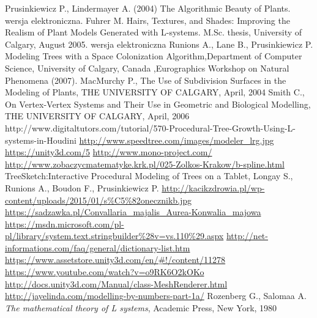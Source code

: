 \documentclass[b5paper,twoside,11pt]{article}
\begin{document}
\begin{thebibliography}{99}
Prusinkiewicz P., Lindermayer A. (2004) The Algorithmic Beauty of Plants.  wersja elektroniczna.
Fuhrer M. Hairs, Textures, and Shades: Improving the Realism of Plant Models Generated with L-systems. M.Sc. thesis, University of Calgary, August 2005. wersja elektroniczna
Runions A., Lane B., Prusinkiewicz P. Modeling Trees with a Space Colonization Algorithm,Department of Computer Science, University of Calgary, Canada ,Eurographics Workshop on Natural Phenomena (2007).
 MacMurchy P., The Use of Subdivision Surfaces in the Modeling of Plants, THE UNIVERSITY OF CALGARY, April, 2004
 Smith C., On Vertex-Vertex Systems and Their Use in Geometric and Biological Modelling, THE UNIVERSITY OF CALGARY, April, 2006
http://www.digitaltutors.com/tutorial/570-Procedural-Tree-Growth-Using-L-systems-in-Houdini
\url{http://www.speedtree.com/images/modeler_lrg.jpg}
\url{https://unity3d.com/5}
\url{http://www.mono-project.com/}
\url{http://www.zobaczycmatematyke.krk.pl/025-Zolkos-Krakow/b-spline.html}
TreeSketch:Interactive Procedural Modeling of Trees on a Tablet, Longay S.,  Runions A., Boudon F., Prusinkiewicz P.
\url{http://kacikzdrowia.pl/wp-content/uploads/2015/01/s%C5%82onecznikb.jpg}
\url{https://sadzawka.pl/Convallaria_majalis_Aurea-Konwalia_majowa}
\url{https://msdn.microsoft.com/pl-pl/library/system.text.stringbuilder%28v=vs.110%29.aspx}
\url{http://net-informations.com/faq/general/dictionary-list.htm}
\url{https://www.assetstore.unity3d.com/en/#!/content/11278}
\url{https://www.youtube.com/watch?v=o9RK6O2kOKo}
\url{http://docs.unity3d.com/Manual/class-MeshRenderer.html}
\url{http://jayelinda.com/modelling-by-numbers-part-1a/}
 Rozenberg G., Salomaa A. \textit{The mathematical theory of L systems}, Academic Press, New York, 1980
\end{thebibliography}

\ifdefined\PROCINCLUDED
%
\else
\end{document}
